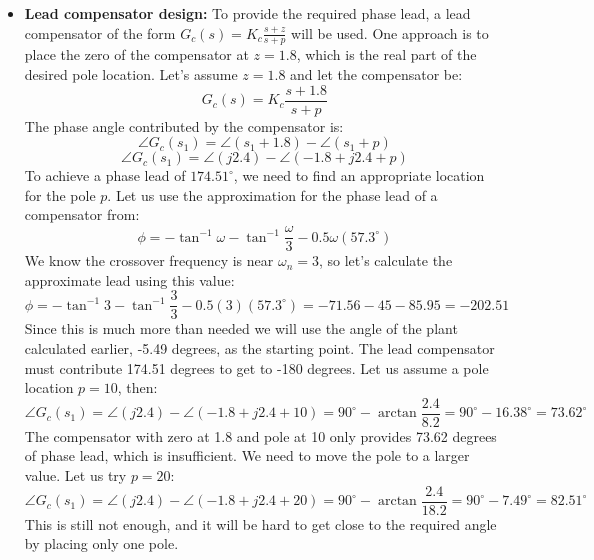 \begin{mdframed}[linecolor=gray!80!black, backgroundcolor=gray!10!white, linewidth=1pt, roundcorner=5pt, frametitle=Solution]
\begin{itemize}
    \item \textbf{Lead compensator design:} To provide the required phase lead, a lead compensator of the form \( G_c(s) = K_c \frac{s+z}{s+p} \) will be used. One approach is to place the zero of the compensator at \(z = 1.8\), which is the real part of the desired pole location. Let's assume \(z=1.8\) and let the compensator be:
    \[
    G_c(s) = K_c \frac{s+1.8}{s+p}
    \]
    The phase angle contributed by the compensator is:
    \[
    \angle G_c(s_1) = \angle(s_1 + 1.8) - \angle(s_1 + p)
    \]
    \[
    \angle G_c(s_1) = \angle(j2.4) - \angle(-1.8 + j2.4 + p)
    \]
    To achieve a phase lead of \(174.51^\circ\), we need to find an appropriate location for the pole \(p\). Let us use the approximation for the phase lead of a compensator from:
    \[
    \phi =  − \tan^{-1} \omega - \tan^{-1} \frac{\omega}{3} − 0.5 \omega(57.3^\circ)
    \]
    We know the crossover frequency is near \(\omega_n=3\), so let's calculate the approximate lead using this value:
    \[
    \phi =  − \tan^{-1} 3 - \tan^{-1} \frac{3}{3} − 0.5(3)(57.3^\circ) =  -71.56 -45 -85.95 = -202.51
    \]
    Since this is much more than needed we will use the angle of the plant calculated earlier, -5.49 degrees, as the starting point. The lead compensator must contribute 174.51 degrees to get to -180 degrees. Let us assume a pole location \(p = 10\), then:
    \[
    \angle G_c(s_1) = \angle(j2.4) - \angle(-1.8 + j2.4 + 10) = 90^\circ - \arctan\frac{2.4}{8.2} = 90^\circ - 16.38^\circ = 73.62^\circ
    \]
    The compensator with zero at 1.8 and pole at 10 only provides 73.62 degrees of phase lead, which is insufficient. We need to move the pole to a larger value. Let us try \(p = 20\):
    \[
    \angle G_c(s_1) = \angle(j2.4) - \angle(-1.8 + j2.4 + 20) = 90^\circ - \arctan\frac{2.4}{18.2} = 90^\circ - 7.49^\circ = 82.51^\circ
    \]
    This is still not enough, and it will be hard to get close to the required angle by placing only one pole.


\end{itemize}
\end{mdframed}
